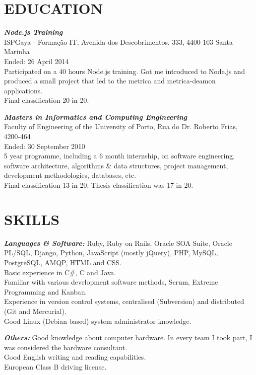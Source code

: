 \documentclass[line,margin]{resume}
\begin{document}
\begin{resume}
\section{EDUCATION}
    {\sl\bf Node.js Training}\\
    ISPGaya - Formação IT, Avenida dos Descobrimentos, 333, 4400-103 Santa Marinha\\
    Ended: 26 April 2014\\
    Participated on a 40 hours Node.js training. Got me introduced to Node.js and produced a small project that led to the metrica and metrica-deamon applications.\\
    Final classification 20 in 20.

    {\sl\bf Masters in Informatics and Computing Engineering}\\
    Faculty of Engineering of the University of Porto, Rua do Dr. Roberto Frias, 4200-464\\
    Ended: 30 September 2010\\
    5 year programme, including a 6 month internship, on software engineering, software architecture, algorithms \& data structures, project management, development methodologies, databases, etc.\\
    Final classification 13 in 20. Thesis classification was 17 in 20.

\section{SKILLS}
    {\sl\bf Languages \& Software:}
        Ruby, Ruby on Rails, Oracle SOA Suite, Oracle PL/SQL, Django, Python, JavaScript (mostly jQuery), PHP, MySQL, PostgreSQL, AMQP, HTML and CSS.\\
        Basic experience in C\#, C and Java.\\
        Familiar with various development software methods, Scrum, Extreme Programming and Kanban.\\
        Experience in version control systems, centralised (Subversion) and distributed (Git and Mercurial).\\
        Good Linux (Debian based) system administrator knowledge.

    {\sl\bf Others:}
        Good knowledge about computer hardware. In every team I took part, I was considered the hardware consultant.\\
        Good English writing and reading capabilities.\\
        European Class B driving license.

\end{resume}
\end{document}
